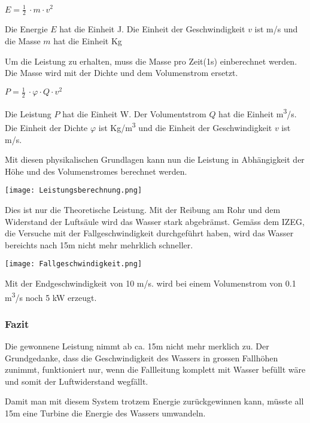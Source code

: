 \begin{center}
\(E =\frac 12\ \cdot m \cdot v^2\)
\end{center}

Die Energie  \(E\)  hat die Einheit  \si{J}. Die Einheit der Geschwindigkeit \(v\) ist \si{m/s} und die Masse \(m\) hat die Einheit \si{Kg}

\newpage

Um die Leistung zu erhalten, muss die Masse pro Zeit(1s) einberechnet werden. Die Masse wird  mit der Dichte und dem Volumenstrom ersetzt.

\begin{center}
\(P =\frac 12\ \cdot \varphi \cdot Q \cdot v^2\)
\end{center}

Die Leistung \(P\) hat die Einheit \si{W}. Der Volumentstrom \(Q\) hat die Einheit \si{m^3/s}. Die Einheit der Dichte \(\varphi\) ist \si{Kg/m^3} und die Einheit der Geschwindigkeit \(v\) ist \si{m/s}.
\newline 
\newline
 \newline


Mit diesen physikalischen Grundlagen kann nun die Leistung in Abhängigkeit der Höhe und des Volumenstromes berechnet werden. 

\begin{center}
\texttt{[image: Leistungsberechnung.png]}
\end{center}

Dies ist nur die Theoretische Leistung. Mit der Reibung am Rohr und dem Widerstand der Luftsäule wird das Wasser stark abgebrämst. Gemäss dem IZEG, die Versuche mit der Fallgeschwindigkeit durchgeführt haben, wird das Wasser bereichts nach 15m nicht mehr mehrklich schneller.

\begin{center}
\texttt{[image: Fallgeschwindigkeit.png]}
\end{center}

Mit der Endgeschwindigkeit von 10 \si{m/s}. wird bei einem Volumenstrom von 0.1 \si{m^3/s} noch 5 \si{kW} erzeugt.

\subsubsection{Fazit}

Die gewonnene Leistung nimmt ab ca. 15m nicht mehr merklich zu. Der Grundgedanke, dass die Geschwindigkeit des Wassers in grossen Fallhöhen zunimmt, funktioniert nur, wenn die Fallleitung komplett mit Wasser befüllt wäre und somit der Luftwiderstand wegfällt.

Damit man mit diesem System trotzem Energie zurückgewinnen kann, müsste all 15m eine Turbine die Energie des Wassers umwandeln.

\clearpage 





